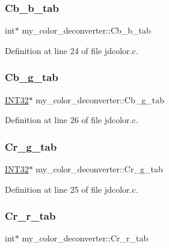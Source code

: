 \subsubsection{\texorpdfstring{Cb\_b\_tab}{Cb\_b\_tab}}
{\footnotesize\ttfamily int$\ast$ my\+\_\+color\+\_\+deconverter\+::\+Cb\+\_\+b\+\_\+tab}



Definition at line 24 of file jdcolor.\+c.

\mbox{\label{structmy__color__deconverter_abb16c33e195531366787333d6b7a2ef6}} 
\subsubsection{\texorpdfstring{Cb\_g\_tab}{Cb\_g\_tab}}
{\footnotesize\ttfamily \mbox{\hyperlink{jmorecfg_8h_a0cb58e7e6f0bad369840a52e54a56ae0}{I\+N\+T32}}$\ast$ my\+\_\+color\+\_\+deconverter\+::\+Cb\+\_\+g\+\_\+tab}



Definition at line 26 of file jdcolor.\+c.

\mbox{\label{structmy__color__deconverter_ab44aebbe0bd6d32aec678c71f7758bfc}} 
\subsubsection{\texorpdfstring{Cr\_g\_tab}{Cr\_g\_tab}}
{\footnotesize\ttfamily \mbox{\hyperlink{jmorecfg_8h_a0cb58e7e6f0bad369840a52e54a56ae0}{I\+N\+T32}}$\ast$ my\+\_\+color\+\_\+deconverter\+::\+Cr\+\_\+g\+\_\+tab}



Definition at line 25 of file jdcolor.\+c.

\mbox{\label{structmy__color__deconverter_a25c4ee8d1066262c23a8181758eb0231}} 
\subsubsection{\texorpdfstring{Cr\_r\_tab}{Cr\_r\_tab}}
{\footnotesize\ttfamily int$\ast$ my\+\_\+color\+\_\+deconverter\+::\+Cr\+\_\+r\+\_\+tab}



